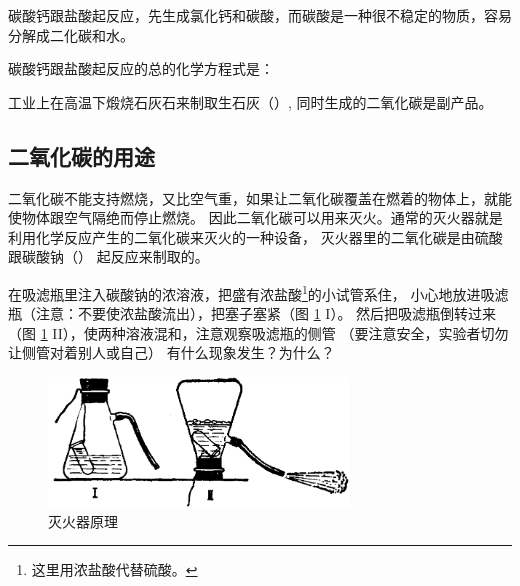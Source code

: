 碳酸钙跟盐酸起反应，先生成氯化钙和碳酸，而碳酸是一种很不稳定的物质，容易分解成二化碳和水。
\begin{fangchengshi}
\end{fangchengshi}

碳酸钙跟盐酸起反应的总的化学方程式是：
\begin{fangchengshi}
\end{fangchengshi}

工业上在高温下煅烧石灰石来制取生石灰（）, 同时生成的二氧化碳是副产品。
\begin{fangchengshi}
\end{fangchengshi}


\subsection{二氧化碳的用途}

二氧化碳不能支持燃烧，又比空气重，如果让二氧化碳覆盖在燃着的物体上，就能使物体跟空气隔绝而停止燃烧。
因此二氧化碳可以用来灭火。通常的灭火器就是利用化学反应产生的二氧化碳来灭火的一种设备，
灭火器里的二氧化碳是由硫酸跟碳酸钠（） 起反应来制取的。
\begin{fangchengshi}
\end{fangchengshi}

\begin{shiyan}
    在吸滤瓶里注入碳酸钠的浓溶液，把盛有浓盐酸\footnote{这里用浓盐酸代替硫酸。}的小试管系住，
    小心地放进吸滤瓶（注意：不要使浓盐酸流出），把塞子塞紧（图 \ref{fig:3-9} I）。
    然后把吸滤瓶倒转过来（图 \ref{fig:3-9} II），使两种溶液混和，注意观察吸滤瓶的侧管
    {\large \heiti（要注意安全，实验者切勿让侧管对着别人或自己）}
    有什么现象发生？为什么？
\end{shiyan}

\begin{figure}[htbp]
    \centering
    \includegraphics[width=8cm]{../pic/czhx1-ch3-9}
    \caption{灭火器原理}\label{fig:3-9}
\end{figure}



